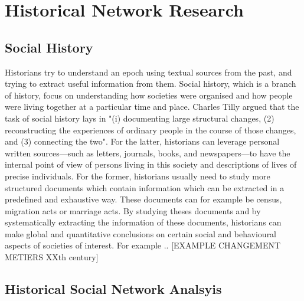 \section{Historical Network Research}

\subsection{Social History}


Historians try to understand an epoch using textual sources from the past, and trying to extract useful information from them.
Social history, which is a branch of history, focus on understanding how societies were organised and how people were living together at a particular time and place. Charles Tilly argued that the task of social history lays in "(i) documenting large structural changes, (2) reconstructing the experiences of ordinary people in the course of those changes, and (3) connecting the two". For the latter, historians can leverage personal written sources---such as letters, journals, books, and newspapers---to have the internal point of view of persons living in this society and descriptions of lives of precise individuals.
For the former, historians usually need to study more structured documents which contain information which can be extracted in a predefined and exhaustive way. These documents can for example be census, migration acts or marriage acts. By studying theses documents and by systematically extracting the information of these documents, historians can make global and quantitative conclusions on certain social and behavioural aspects of societies of interest.
For example .. [EXAMPLE CHANGEMENT METIERS XXth century]


\subsection{Historical Social Network Analsyis}

